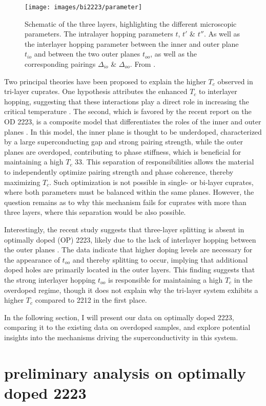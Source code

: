 \begin{figure}
	\centering
	\texttt{[image: images/bi2223/parameter]}
	\caption{Schematic of the three  layers, highlighting the different microscopic parameters. The intralayer hopping parameters $t$, $t'$ \& $t''$. As well as the interlayer hopping parameter between the inner and outer plane $t_{io}$ and between the two outer planes $t_{oo}$, as well as the corresponding pairings $\Delta_{io}$ \& $\Delta_{oo}$. From \cite{luo_electronic_2023}.}
	\label{fig:parameter}
\end{figure}


Two principal theories have been proposed to explain the higher $T_c$ observed in tri-layer cuprates.
One hypothesis attributes the enhanced $T_c$ to interlayer hopping, suggesting that these interactions play a direct role in increasing the critical temperature \cite{chakravarty_explanation_2004,nishiguchi_superconductivity_2013}.
The second, which is favored by the recent report on the OD 2223, is a composite model that differentiates the roles of the inner and outer planes \cite{kivelson_making_2002,berg_route_2008,okamoto_enhanced_2008}.
In this model, the inner plane is thought to be underdoped, characterized by a large superconducting gap and strong pairing strength, while the outer planes are overdoped, contributing to phase stiffness, which is beneficial for maintaining a high $T_c$ \cite{emery_importance_1995} 33.
This separation of responsibilities allows the material to independently optimize pairing strength and phase coherence, thereby maximizing $T_c$.
Such optimization is not possible in single- or bi-layer cuprates, where both parameters must be balanced within the same planes.
However, the question remains as to why this mechanism fails for cuprates with more than three  layers, where this separation would be also possible.

Interestingly, the recent study suggests that three-layer splitting is absent in optimally doped (OP) 2223, likely due to the lack of interlayer hopping between the outer planes \cite{luo_electronic_2023}.
The data indicate that higher doping levels are necessary for the appearance of $t_{oo}$ and thereby splitting to occur, implying that additional doped holes are primarily located in the outer layers.
This finding suggests that the strong interlayer hopping $t_{oo}$ is responsible for maintaining a high $T_c$ in the overdoped regime, though it does not explain why the tri-layer system exhibits a higher $T_c$ compared to 2212 in the first place.

In the following section, I will present our data on optimally doped 2223, comparing it to the existing data on overdoped samples, and explore potential insights into the mechanisms driving the superconductivity in this system.

\section{preliminary analysis on optimally doped 2223}
